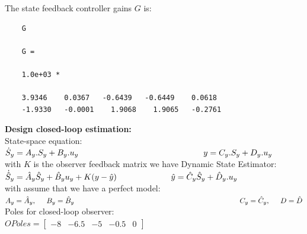 \documentclass[14pt,a4paper]{article}
\begin{document}
	The state feedback controller gains $G$ is:
	\begin{lstlisting}
	G
	
	G =
	
	1.0e+03 *
	
	3.9346    0.0367   -0.6439   -0.6449    0.0618
	-1.9330   -0.0001    1.9068    1.9065   -0.2761
	\end{lstlisting}
	
	\pagebreak

\large\textbf{Design closed-loop estimation:} \\
	State-space equation: \hspace{1cm}	$\dot{S}_y = A_y.S_y + B_y.u_y \\
	\hspace*{5.3cm}		y = C_y.S_y + D_y.u_y $ \\
	with $K$ is the observer feedback matrix we have Dynamic State Estimator:\\
	\hspace*{2cm} $ \dot{\hat{S}}_y = \hat{A}_y\hat{S}_y + \hat{B}_yu_y + K(y - \hat{y}) \\
	\hspace*{2.3cm} \hat{y} = \hat{C}_y\hat{S}_y + \hat{D}_y.u_y $ \\
	with assume that we have a perfect model: $ A_y = \hat{A}_y, \hspace{0.5cm} B_y = \hat{B}_y \\ \hspace*{8cm} C_y = \hat{C}_y, \hspace{0.5cm} D = \hat{D} $ \\
	Poles for closed-loop observer: \\
	\hspace*{2cm} $ OPoles = \begin{bmatrix} -8&-6.5&-5& -0.5& 0 \end{bmatrix}$ \\
	
\end{document}
